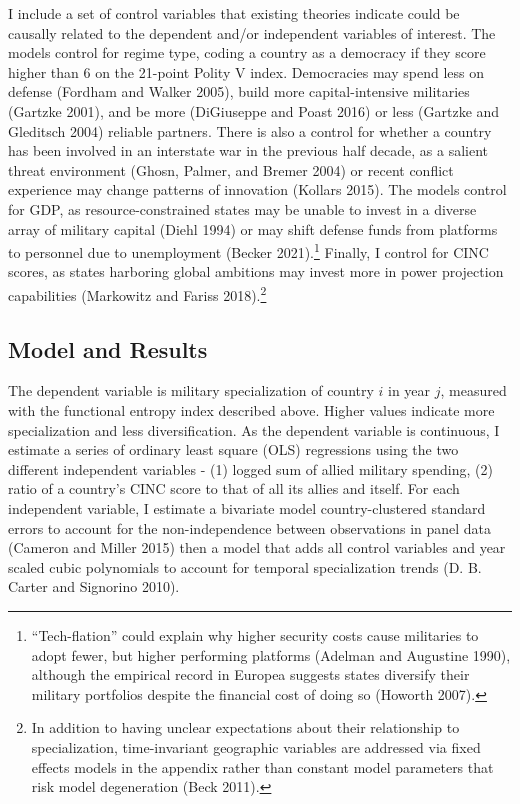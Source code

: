 \documentclass[
  12,
  letterpaper,
  DIV=11,
  numbers=noendperiod]{scrartcl}
\begin{document}
I include a set of control variables that existing theories indicate
could be causally related to the dependent and/or independent variables
of interest. The models control for regime type, coding a country as a
democracy if they score higher than 6 on the 21-point Polity V index.
Democracies may spend less on defense (Fordham and Walker 2005), build
more capital-intensive militaries (Gartzke 2001), and be more
(DiGiuseppe and Poast 2016) or less (Gartzke and Gleditsch 2004)
reliable partners. There is also a control for whether a country has
been involved in an interstate war in the previous half decade, as a
salient threat environment (Ghosn, Palmer, and Bremer 2004) or recent
conflict experience may change patterns of innovation (Kollars 2015).
The models control for GDP, as resource-constrained states may be unable
to invest in a diverse array of military capital (Diehl 1994) or may
shift defense funds from platforms to personnel due to unemployment
(Becker 2021).\footnote{``Tech-flation'' could explain why higher
  security costs cause militaries to adopt fewer, but higher performing
  platforms (Adelman and Augustine 1990), although the empirical record
  in Europea suggests states diversify their military portfolios despite
  the financial cost of doing so (Howorth 2007).} Finally, I control for
CINC scores, as states harboring global ambitions may invest more in
power projection capabilities (Markowitz and Fariss 2018).\footnote{In
  addition to having unclear expectations about their relationship to
  specialization, time-invariant geographic variables are addressed via
  fixed effects models in the appendix rather than constant model
  parameters that risk model degeneration (Beck 2011).}

\hypertarget{model-and-results}{%
\subsection{Model and Results}\label{model-and-results}}

The dependent variable is military specialization of country \(i\) in
year \(j\), measured with the functional entropy index described above.
Higher values indicate more specialization and less diversification. As
the dependent variable is continuous, I estimate a series of ordinary
least square (OLS) regressions using the two different independent
variables - (1) logged sum of allied military spending, (2) ratio of a
country's CINC score to that of all its allies and itself. For each
independent variable, I estimate a bivariate model country-clustered
standard errors to account for the non-independence between observations
in panel data (Cameron and Miller 2015) then a model that adds all
control variables and year scaled cubic polynomials to account for
temporal specialization trends (D. B. Carter and Signorino 2010).
\end{document}
